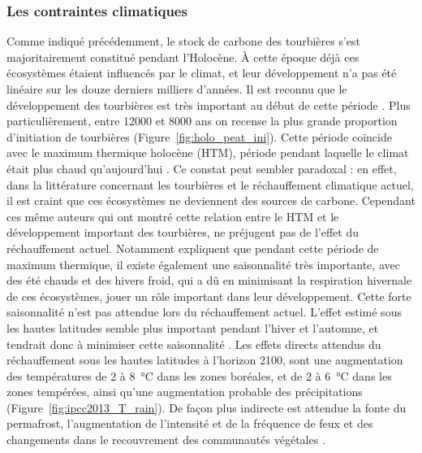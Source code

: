 \subsubsection{Les contraintes climatiques}

Comme indiqué précédemment, le stock de carbone des tourbières s'est majoritairement constitué pendant l'Holocène.
À cette époque déjà ces écosystèmes étaient influencés par le climat, et leur développement n'a pas été linéaire sur les douze derniers milliers d'années.
Il est reconnu que le développement des tourbières est très important au début de cette période \citep{smith2004,macdonald2006,yu2009}.
Plus particulièrement, entre \num{12000} et \num{8000} ans on recense la plus grande proportion d'initiation de tourbières (Figure~\ref{fig:holo_peat_ini}).
Cette période coïncide avec le maximum thermique holocène (HTM), période pendant laquelle le climat était plus chaud qu'aujourd’hui \citep{kaufman2004}.
Ce constat peut sembler paradoxal : en effet, dans la littérature concernant les tourbières et le réchauffement climatique actuel, il est craint que ces écosystèmes ne deviennent des sources de carbone.
Cependant ces même auteurs qui ont montré cette relation entre le HTM et le développement important des tourbières, ne préjugent pas de l'effet du réchauffement actuel.
Notamment \citet{jones2010} expliquent que pendant cette période de maximum thermique, il existe également une saisonnalité très importante, avec des été chauds et des hivers froid, qui a dû en minimisant la respiration hivernale de ces écosystèmes, jouer un rôle important dans leur développement.
Cette forte saisonnalité n'est pas attendue lors du réchauffement actuel.
L'effet estimé sous les hautes latitudes semble plus important pendant l'hiver et l'automne, et tendrait donc à minimiser cette saisonnalité \citep{christensen2007}.
Les effets directs attendus du réchauffement sous les hautes latitudes à l'horizon 2100, sont une augmentation des températures de 2 à \SI{8}{\degreeCelsius} dans les zones boréales, et de 2 à \SI{6}{\degreeCelsius} dans les zones tempérées, ainsi  qu'une augmentation probable des précipitations (Figure~\ref{fig:ipcc2013_T_rain}).
De façon plus indirecte est attendue la fonte du permafrost, l'augmentation de l'intensité et de la fréquence de feux et des changements dans le recouvrement des communautés végétales \citep{christensen2013,frolking2011}.

